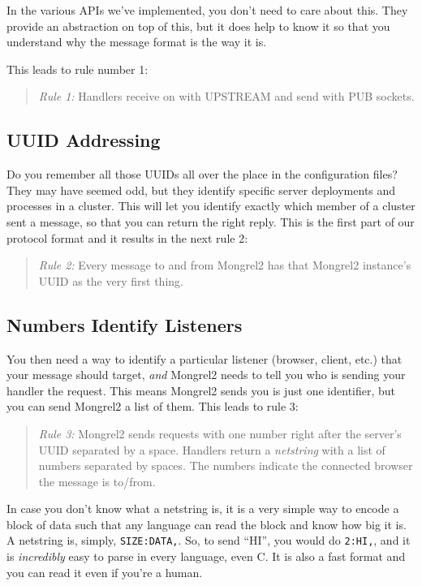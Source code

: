 In the various APIs we've implemented, you don't need to care about this.
They provide an abstraction on top of this, but it does help to know it
so that you understand why the message format is the way it is.

This leads to rule number 1:

\begin{quote}
\emph{Rule 1:} Handlers receive on with UPSTREAM and send with PUB sockets.
\end{quote}

\subsection{UUID Addressing}

Do you remember all those UUIDs all over the place in the configuration files?
They may have seemed odd, but they identify specific server deployments and
processes in a cluster.  This will let you identify exactly which member of a
cluster sent a message, so that you can return the right reply.  This is the
first part of our protocol format and it results in the next rule 2:

\begin{quote}
\emph{Rule 2:} Every message to and from Mongrel2 has that Mongrel2 instance's
UUID as the very first thing.
\end{quote}

\subsection{Numbers Identify Listeners}

You then need a way to identify a particular listener (browser, client, etc.)
that your message should target, \emph{and} Mongrel2 needs to tell you who is
sending your handler the request.  This means Mongrel2 sends you is just one
identifier, but you can send Mongrel2 a list of them.  This leads to rule 3:

\begin{quote}
\emph{Rule 3:} Mongrel2 sends requests with one number right after the server's
UUID separated by a space.  Handlers return a \emph{netstring} with a list of
numbers separated by spaces.  The numbers indicate the connected browser the
message is to/from.
\end{quote}

In case you don't know what a netstring is, it is a very simple way to encode a
block of data such that any language can read the block and know how big it is.
A netstring is, simply, \verb|SIZE:DATA,|. So, to send ``HI'', you would do
\verb|2:HI,|, and it is \emph{incredibly} easy to parse in every language, even
C.  It is also a fast format and you can read it even if you're a human.


